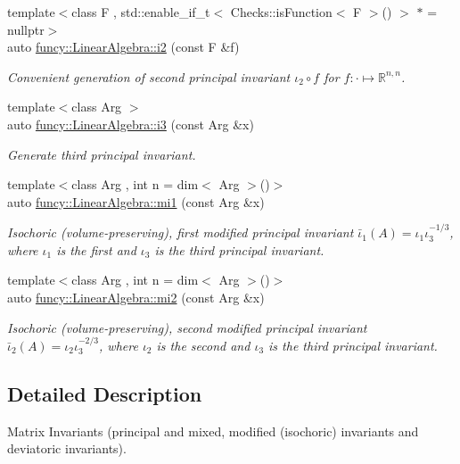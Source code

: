 \begin{DoxyCompactItemize}
{\footnotesize template$<$class F , std\-::enable\-\_\-if\-\_\-t$<$ Checks\-::is\-Function$<$ F $>$() $>$ $\ast$  = nullptr$>$ }\\auto \hyperlink{group__InvariantGroup_gaa9c14aef534cb03abd7c84b2ce36415d}{funcy\-::\-Linear\-Algebra\-::i2} (const F \&f)
\begin{DoxyCompactList}\small\item\em Convenient generation of second principal invariant $ \iota_2\circ f $ for $f:\cdot\mapsto\mathbb{R}^{n,n}$. \end{DoxyCompactList}\item 
{\footnotesize template$<$class Arg $>$ }\\auto \hyperlink{group__InvariantGroup_gab549eecd5d41cabdf6ad9d5fd5ef1207}{funcy\-::\-Linear\-Algebra\-::i3} (const Arg \&x)
\begin{DoxyCompactList}\small\item\em Generate third principal invariant. \end{DoxyCompactList}\item 
{\footnotesize template$<$class Arg , int n = dim$<$ Arg $>$()$>$ }\\auto \hyperlink{group__InvariantGroup_ga22a3d609bf5ccffa5c8c8c25c570ace6}{funcy\-::\-Linear\-Algebra\-::mi1} (const Arg \&x)
\begin{DoxyCompactList}\small\item\em Isochoric (volume-\/preserving), first modified principal invariant $ \bar\iota_1(A)=\iota_1\iota_3^{-1/3} $, where $\iota_1$ is the first and $\iota_3$ is the third principal invariant. \end{DoxyCompactList}\item 
{\footnotesize template$<$class Arg , int n = dim$<$ Arg $>$()$>$ }\\auto \hyperlink{group__InvariantGroup_gac03f2f4188cc0c6acbbcaf01c480e6e8}{funcy\-::\-Linear\-Algebra\-::mi2} (const Arg \&x)
\begin{DoxyCompactList}\small\item\em Isochoric (volume-\/preserving), second modified principal invariant $ \bar\iota_2(A)=\iota_2\iota_3^{-2/3} $, where $\iota_2$ is the second and $\iota_3$ is the third principal invariant. \end{DoxyCompactList}\end{DoxyCompactItemize}


\subsection{Detailed Description}
Matrix Invariants (principal and mixed, modified (isochoric) invariants and deviatoric invariants). 

